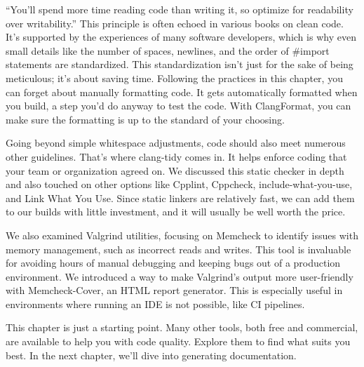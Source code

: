 “You’ll spend more time reading code than writing it, so optimize for readability over writability.” This principle is often echoed in various books on clean code. It’s supported by the experiences of many software developers, which is why even small details like the number of spaces, newlines, and the order of \#import statements are standardized. This standardization isn’t just for the sake of being meticulous; it’s about saving time. Following the practices in this chapter, you can forget about manually formatting code. It gets automatically formatted when you build, a step you’d do anyway to test the code. With ClangFormat, you can make sure the formatting is up to the standard of your choosing.

Going beyond simple whitespace adjustments, code should also meet numerous other guidelines. That’s where clang-tidy comes in. It helps enforce coding that your team or organization agreed on. We discussed this static checker in depth and also touched on other options like Cpplint, Cppcheck, include-what-you-use, and Link What You Use. Since static linkers are relatively fast, we can add them to our builds with little investment, and it will usually be well worth the price.

We also examined Valgrind utilities, focusing on Memcheck to identify issues with memory management, such as incorrect reads and writes. This tool is invaluable for avoiding hours of manual debugging and keeping bugs out of a production environment. We introduced a way to make Valgrind's output more user-friendly with Memcheck-Cover, an HTML report generator. This is especially useful in environments where running an IDE is not possible, like CI pipelines.

This chapter is just a starting point. Many other tools, both free and commercial, are available to help you with code quality. Explore them to find what suits you best. In the next chapter, we’ll dive into generating documentation.